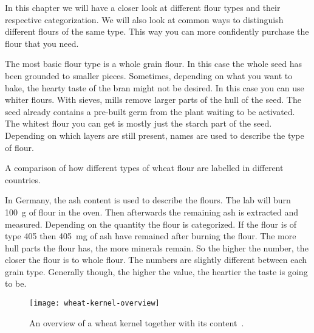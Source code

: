 In this chapter we will have a closer look at different flour types
and their respective categorization. We will also look at common
ways to distinguish different flours of the same type. This way you can more confidently
purchase the flour that you need.

The most basic flour type is a whole grain flour. In this case the whole seed has
been grounded to smaller pieces. Sometimes, depending on what you want to bake,
the hearty taste of the bran might not be desired. In this case you can use
whiter flours. With sieves, mills remove larger parts of the hull of the seed.
The seed already contains a pre-built germ from the plant waiting to be
activated. The whitest flour you can get is mostly just the starch part of the seed.
Depending on which layers are still present, names are used to describe the
type of flour.

\begin{table}[!htb]
    \begin{center}
        
        \caption[Labelling of wheat flour]{A comparison of how different types
            of wheat flour are labelled in different countries.}%
        \label{tab:flour-types-comparison}
    \end{center}
\end{table}

In Germany, the ash content is used to describe the flours. The lab will burn
\qty{100}{\gram} of flour in the oven. Then afterwards the remaining ash is extracted
and measured. Depending on the quantity the flour is categorized. If the flour
is of type 405 then \qty{405}{\mg} of ash have remained after burning the
flour. The more hull parts the flour has, the more minerals remain. So the
higher the number, the closer the flour is to whole flour. The numbers are
slightly different between each grain type. Generally though, the higher the
value, the heartier the taste is going to be.

\begin{figure}[htb!]
  \texttt{[image: wheat-kernel-overview]}
  \caption[Content of a wheat kernel]{An overview of a wheat kernel together
      with its content~\cite{wheat+kernel}.}%
  \label{fig:wheat-kernel-overview}
\end{figure}

